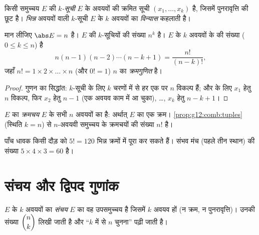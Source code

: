 \begin{definition}[$k$-सूचियाँ]\label{def:g12:comb:tuples}
किसी समुच्चय $E$ की \emph{$k$-सूची} $E$ के अवयवों की क्रमित सूची $(x_1, \dots, x_k)$ है,
जिसमें पुनरावृत्ति की छूट है। \emph{भिन्न} अवयवों वाली $k$-सूची $E$ के $k$
अवयवों का \emph{विन्यास} कहलाती है।
\end{definition}

\begin{proposition}\label{prop:g12:comb:tuples}
मान लीजिए $\abs E = n$ है। $E$ की $k$-सूचियों की संख्या $n^k$ है। $E$ के $k$
अवयवों के  की संख्या ($0 \leq k \leq n$) है
\[
n(n-1)(n-2)\cdots(n-k+1) = \frac{n!}{(n-k)!},
\]
जहाँ $n! = 1 \times 2 \times \dots \times n$ (और $0! = 1$) $n$ का \emph{क्रमगुणित} है।
\end{proposition}

\begin{proof}
गुणन का सिद्धांत: $k$-सूची के लिए $k$ चरणों में से हर एक पर $n$ विकल्प
हैं; और  के लिए $x_1$ हेतु $n$ विकल्प, फिर $x_2$ हेतु $n - 1$ (एक अवयव
काम में आ चुका), \dots, $x_k$ हेतु $n - k + 1$।
\end{proof}

\begin{definition}[क्रमचय]\label{def:g12:comb:permutation}
$E$ का \emph{क्रमचय} $E$ के सभी $n$ अवयवों का  है:
अर्थात् $E$ का एक क्रम। \cref{prop:g12:comb:tuples} (स्थिति $k = n$) से $n$-अवयवी समुच्चय के
क्रमचयों की संख्या $n!$ है।
\end{definition}

\begin{example}
पाँच धावक किसी दौड़ को $5! = 120$ भिन्न क्रमों में पूरा कर सकते हैं। संभव मंच
(पहले तीन स्थान) की संख्या $5 \times 4 \times 3 = 60$ है।
\end{example}

\section{संचय और द्विपद गुणांक}

\begin{definition}[संचय]\label{def:g12:comb:combination}
$E$ के $k$ अवयवों का \emph{संचय} $E$ का वह उपसमुच्चय है जिसमें
$k$ अवयव हों (न क्रम, न पुनरावृत्ति)। उनकी संख्या $\dbinom{n}{k}$
लिखी जाती है और ``$k$ में से $n$ चुनना'' पढ़ी जाती है।
\end{definition}

